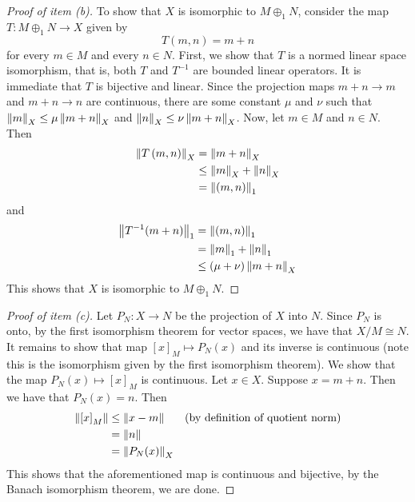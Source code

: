 \begin{proof}[Proof of item (b)]
    To show that $X$ is isomorphic to $M \oplus _{1} N$, consider the map $T: M \oplus _{1} N \to X$ given by
    \begin{equation*}
	T(m,n)=m+n
    \end{equation*}
    for every $m\in M$ and every $n\in N$. First, we show that $T$ is a normed linear space isomorphism, that is, both $T$ and $T^{-1}$ are bounded linear operators. 
    It is immediate that $T$ is bijective and linear. Since the projection maps $m+n \to m$ and $m+n \to n$ are continuous, there are some constant $\mu$ and $\nu$ such that $\left\lVert m \right\rVert_{X} \le \mu \left\lVert m+n \right\rVert_{X}$ and  $\left\lVert n \right\rVert_{X} \le \nu \left\lVert m+n \right\rVert_{X}$. Now, let $m\in M$ and $n\in N$. Then
    \begin{align*}
	\left\lVert T\left( m,n \right) \right\rVert_{X} &= \left\lVert m+n \right\rVert_{X} \\
	&\le \left\lVert m \right\rVert_{X} + \left\lVert n \right\rVert_{X} \\
	&=\left\lVert \left( m,n \right) \right\rVert_{1}
    \end{align*}
and
\begin{align*}
    \left\lVert T^{-1} (m+n) \right\rVert_{1} &= \left\lVert \left( m,n \right) \right\rVert_{1} \\
    &= \left\lVert m \right\rVert_{1} + \left\lVert n \right\rVert_{1} \\
    &\le \left( \mu + \nu \right) \left\lVert m+n \right\rVert_{X}
\end{align*}
This shows that $X$ is isomorphic to $M\oplus _{1} N$.
\end{proof}
\begin{proof}[Proof of item (c)]
    Let $P_{N} : X \to N$ be the projection of $X$ into $N$. Since $P_{N}$ is onto, by the first isomorphism theorem for vector spaces, we have that $X/M \cong N$. It remains to show that map $\left[ x \right]_{M} \mapsto P_{N}(x)$ and its inverse is continuous (note this is the isomorphism given by the first isomorphism theorem). We show that the map $P_{N} \left( x \right) \mapsto [x]_{M}$ is continuous. Let $x\in X$. Suppose $x=m+n$. Then we have that $P_{N}(x)=n$. Then
    \begin{align*}
	\left\lVert \left[ x \right]_{M} \right\rVert &\le \left\lVert x-m \right\rVert & \text{(by definition of quotient norm)} \\
	&= \left\lVert n \right\rVert \\
	&= \left\lVert P_{N}(x) \right\rVert_{X}
    \end{align*}
    This shows that the aforementioned map is continuous and bijective, by the Banach isomorphism theorem, we are done.
\end{proof}
